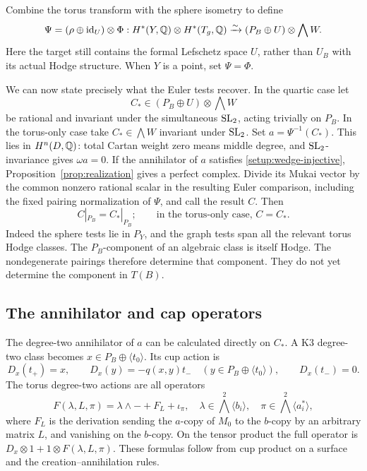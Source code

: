 Combine the torus transform with the sphere isometry to define
\begin{equation}\label{coh:dictionary}
 \Psi=(\rho\oplus\operatorname{id}_U)\otimes\Phi:
 H^*(Y,\mathbb Q)\otimes H^*(T_g,\mathbb Q)
 \xrightarrow{\sim}(P_B\oplus U)\otimes\bigwedge W.
\end{equation}
Here the target still contains the formal Lefschetz space \(U\),
rather than \(U_B\) with its actual Hodge structure.  When \(Y\) is
a point, set \(\Psi=\Phi\).

We can now state precisely what the Euler tests recover.  In the
quartic case let
\begin{equation}\label{coh:input-space}
 C_*\in (P_B\oplus U)\otimes\bigwedge W
\end{equation}
be rational and invariant under the simultaneous \(\operatorname{SL}_2\), acting
trivially on \(P_B\).  In the torus-only case take
\(C_*\in\bigwedge W\) invariant under \(\operatorname{SL}_2\).
Set \(a=\Psi^{-1}(C_*)\).  This lies in \(H^n(D,\mathbb Q)\): total Cartan weight
zero means middle degree, and \(\operatorname{SL}_2\)-invariance gives
\(\omega a=0\).
If the annihilator of \(a\) satisfies
\eqref{setup:wedge-injective}, Proposition~\ref{prop:realization}
gives a perfect complex.  Divide its Mukai vector by the common
nonzero rational scalar in the resulting Euler comparison, including
the fixed pairing normalization of \(\Psi\), and call the result \(C\).
Then
\begin{equation}\label{coh:determined-component}
 C|_{P_B}=C_*|_{P_B};
 \qquad\text{in the torus-only case, }C=C_*.
\end{equation}
Indeed the sphere tests lie in \(P_Y\), and the graph tests span all
the relevant torus Hodge classes.  The \(P_B\)-component of an
algebraic class is itself Hodge.  The nondegenerate pairings therefore
determine that component.  They do not yet determine the component in
\(T(B)\).

\subsection{The annihilator and cap operators}

The degree-two annihilator of \(a\) can be calculated directly on
\(C_*\).  A K3 degree-two class becomes
\(x\in P_B\oplus\langle t_0\rangle\).  Its cup action is
\begin{equation}\label{coh:lowering-k3}
 D_x(t_+)=x,\qquad
 D_x(y)=-q(x,y)t_-\quad
   (y\in P_B\oplus\langle t_0\rangle),\qquad
 D_x(t_-)=0.
\end{equation}
The torus degree-two actions are all operators
\begin{equation}\label{coh:lowering-torus}
 F(\lambda,L,\pi)=\lambda\wedge-+F_L+\iota_\pi,
 \quad
 \lambda\in\bigwedge^2\langle b_i\rangle,
 \quad \pi\in\bigwedge^2\langle a_i^*\rangle,
\end{equation}
where \(F_L\) is the derivation sending the \(a\)-copy of \(M_0\)
to the \(b\)-copy by an arbitrary matrix \(L\), and vanishing on the
\(b\)-copy.  On the tensor product the full operator is
\(D_x\otimes1+1\otimes F(\lambda,L,\pi)\).  These formulas follow
from cup product on a surface and the creation--annihilation rules.

